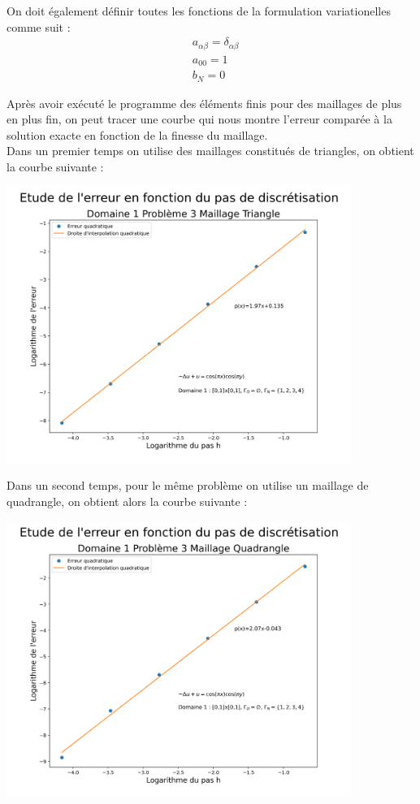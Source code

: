 \documentclass[a4paper, 12pt, french]{report}
\begin{document}
On doit également définir toutes les fonctions de la formulation variationelles comme suit : 
\begin{align*}
    &a_{\alpha\beta} = \delta_{\alpha\beta}\\
    &a_{00} = 1\\
    &b_N = 0
\end{align*}

Après avoir exécuté le programme des éléments finis pour des maillages de plus en plus fin, on peut tracer une courbe qui nous montre l'erreur comparée à la solution exacte en fonction de la finesse du maillage.\\
Dans un premier temps on utilise des maillages constitués de triangles, on obtient la courbe suivante :

\begin{center}
    \includegraphics[height=9cm]{../Images/Courbes_Erreurs/D1P3T.png}
\end{center}

Dans un second temps, pour le même problème on utilise un maillage de quadrangle, on obtient alors la courbe suivante :
\begin{center}
    \includegraphics[height=9cm]{../Images/Courbes_Erreurs/D1P3Q.png}
\end{center}
\end{document}
